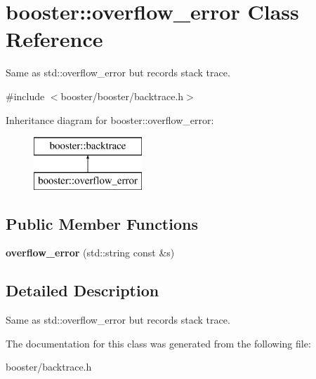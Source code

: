 \section{booster\-:\-:overflow\-\_\-error \-Class \-Reference}
\label{classbooster_1_1overflow__error}


\-Same as std\-::overflow\-\_\-error but records stack trace.  




{\ttfamily \#include $<$booster/booster/backtrace.\-h$>$}

\-Inheritance diagram for booster\-:\-:overflow\-\_\-error\-:\begin{figure}[H]
\begin{center}
\leavevmode
\includegraphics[height=2.000000cm]{classbooster_1_1overflow__error}
\end{center}
\end{figure}
\subsection*{\-Public \-Member \-Functions}
\begin{DoxyCompactItemize}
\item 
{\bfseries overflow\-\_\-error} (std\-::string const \&s)\label{classbooster_1_1overflow__error_afc09cb72a93db7b1002f757ab4d8e1ad}

\end{DoxyCompactItemize}


\subsection{\-Detailed \-Description}
\-Same as std\-::overflow\-\_\-error but records stack trace. 

\-The documentation for this class was generated from the following file\-:\begin{DoxyCompactItemize}
\item 
booster/backtrace.\-h\end{DoxyCompactItemize}
